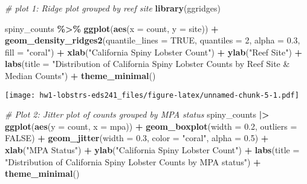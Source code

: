 \documentclass[
]{article}
\newenvironment{Shaded}{\begin{snugshade}}{\end{snugshade}}
\newcommand{\AttributeTok}[1]{\textcolor[rgb]{0.13,0.29,0.53}{#1}}
\newcommand{\CommentTok}[1]{\textcolor[rgb]{0.56,0.35,0.01}{\textit{#1}}}
\newcommand{\ConstantTok}[1]{\textcolor[rgb]{0.56,0.35,0.01}{#1}}
\newcommand{\DecValTok}[1]{\textcolor[rgb]{0.00,0.00,0.81}{#1}}
\newcommand{\FloatTok}[1]{\textcolor[rgb]{0.00,0.00,0.81}{#1}}
\newcommand{\FunctionTok}[1]{\textcolor[rgb]{0.13,0.29,0.53}{\textbf{#1}}}
\newcommand{\NormalTok}[1]{#1}
\newcommand{\SpecialCharTok}[1]{\textcolor[rgb]{0.81,0.36,0.00}{\textbf{#1}}}
\newcommand{\StringTok}[1]{\textcolor[rgb]{0.31,0.60,0.02}{#1}}
\begin{document}
\begin{Shaded}
\begin{Highlighting}[]
\CommentTok{\# plot 1: Ridge plot grouped by reef site}
\FunctionTok{library}\NormalTok{(ggridges)}

\NormalTok{spiny\_counts }\SpecialCharTok{\%\textgreater{}\%} 
    \FunctionTok{ggplot}\NormalTok{(}\FunctionTok{aes}\NormalTok{(}\AttributeTok{x =}\NormalTok{ count, }\AttributeTok{y =}\NormalTok{ site)) }\SpecialCharTok{+}
    \FunctionTok{geom\_density\_ridges2}\NormalTok{(}\AttributeTok{quantile\_lines =} \ConstantTok{TRUE}\NormalTok{,}
                         \AttributeTok{quantiles =} \DecValTok{2}\NormalTok{,}
                         \AttributeTok{alpha =} \FloatTok{0.3}\NormalTok{,}
                         \AttributeTok{fill =} \StringTok{"coral"}\NormalTok{) }\SpecialCharTok{+}
    \FunctionTok{xlab}\NormalTok{(}\StringTok{"California Spiny Lobster Count"}\NormalTok{) }\SpecialCharTok{+}
    \FunctionTok{ylab}\NormalTok{(}\StringTok{"Reef Site"}\NormalTok{) }\SpecialCharTok{+}
    \FunctionTok{labs}\NormalTok{(}\AttributeTok{title =} \StringTok{"Distribution of California Spiny Lobster Counts by Reef Site \& Median Counts"}\NormalTok{) }\SpecialCharTok{+}
    \FunctionTok{theme\_minimal}\NormalTok{()}
\end{Highlighting}
\end{Shaded}

\texttt{[image: hw1-lobstrs-eds241\_files/figure-latex/unnamed-chunk-5-1.pdf]}

\begin{Shaded}
\begin{Highlighting}[]
\CommentTok{\# Plot 2: Jitter plot of counts grouped by MPA status}
\NormalTok{spiny\_counts }\SpecialCharTok{|\textgreater{}}
    \FunctionTok{ggplot}\NormalTok{(}\FunctionTok{aes}\NormalTok{(}\AttributeTok{y =}\NormalTok{ count, }\AttributeTok{x =}\NormalTok{ mpa)) }\SpecialCharTok{+}
    \FunctionTok{geom\_boxplot}\NormalTok{(}\AttributeTok{width =} \FloatTok{0.2}\NormalTok{, }\AttributeTok{outliers =} \ConstantTok{FALSE}\NormalTok{) }\SpecialCharTok{+}
    \FunctionTok{geom\_jitter}\NormalTok{(}\AttributeTok{width =} \FloatTok{0.3}\NormalTok{, }\AttributeTok{color =} \StringTok{"coral"}\NormalTok{, }\AttributeTok{alpha =} \FloatTok{0.5}\NormalTok{) }\SpecialCharTok{+}
    \FunctionTok{xlab}\NormalTok{(}\StringTok{"MPA Status"}\NormalTok{) }\SpecialCharTok{+}
    \FunctionTok{ylab}\NormalTok{(}\StringTok{"California Spiny Lobster Count"}\NormalTok{) }\SpecialCharTok{+}
    \FunctionTok{labs}\NormalTok{(}\AttributeTok{title =} \StringTok{"Distribution of California Spiny Lobster Counts by MPA status"}\NormalTok{) }\SpecialCharTok{+}
    \FunctionTok{theme\_minimal}\NormalTok{()}
\end{Highlighting}
\end{Shaded}
\end{document}
